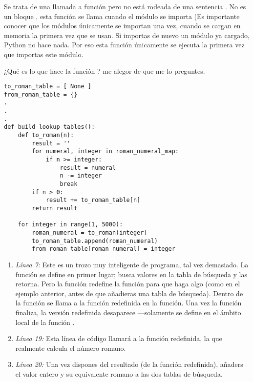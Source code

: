 Se trata de una llamada a función pero no está rodeada de una sentencia . No es un bloque , esta función se llama cuando el módulo se importa (Es importante conocer que los módulos únicamente se importan una vez, cuando se cargan en memoria la primera vez que se usan. Si importas de nuevo un módulo ya cargado, Python no hace nada. Por eso esta función únicamente se ejecuta la primera vez que importas este módulo.

¿Qué es lo que hace la función ? me alegor de que me lo preguntes.

\noindent\begin{minipage}{\textwidth}
\begin{lstlisting}[mathescape=True]
to_roman_table = [ None ]
from_roman_table = {}
.
.
.
def build_lookup_tables():
    def to_roman(n):
        result = ''
        for numeral, integer in roman_numeral_map:
            if n >= integer:
                result = numeral
                n -= integer
                break
        if n > 0:
            result += to_roman_table[n]
        return result

    for integer in range(1, 5000):
        roman_numeral = to_roman(integer)
        to_roman_table.append(roman_numeral)
        from_roman_table[roman_numeral] = integer
\end{lstlisting}
\end{minipage}

\begin{enumerate}

\item \emph{Línea 7:} Este es un trozo muy inteligente de programa, tal vez demasiado. La función  se define en primer lugar; busca valores en la tabla de búsqueda y las retorna. Pero la función  redefine la función para que haga algo (como en el ejemplo anterior, antes de que añadieras una tabla de búsqueda). Dentro de la función  se llama a la función  redefinida en la función. Una vez la función  finaliza, la versión redefinida desaparece ---solamente se define en el ámbito local de la función .

\item \emph{Línea 19:} Esta línea de código llamará a la función  redefinida, la que realmente calcula el número romano.

\item \emph{Línea 20:} Una vez dispones del resultado (de la función  redefinida), añaders el valor entero y su equivalente romano a las dos tablas de búsqueda.

\end{enumerate}

